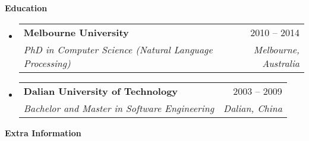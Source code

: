 \documentclass[letterpaper,12pt]{article}[leftmargin=*]
\makeatletter
\def \entryspacing {-0pt}
\renewcommand{\section}[2]{\vspace{5pt}
  \colorbox{secondary}{\color{white}\raggedbottom\normalsize\textbf{{#1}{\hspace{7pt}#2}}}
}
\newcommand{\resumeEntryStart}{\begin{itemize}[leftmargin=2.5mm]}
\newcommand{\resumeEntryEnd}{\end{itemize}\vspace{\entryspacing}}
\newcommand{\resumeItemListStart}{\begin{itemize}[leftmargin=4.5mm]}
\newcommand{\resumeItemListEnd}{\end{itemize}}
\newcommand{\resumeItem}[1]{
  \item\small{
    {#1 \vspace{-2pt}}
  }
}
\newcommand{\resumeEntryTSDL}[4]{
  \vspace{-1pt}\item[]
    \begin{tabularx}{0.97\textwidth}{X@{\hspace{60pt}}r}
      \textbf{\color{primary}#1} & {\firabook\color{accent}\small#2} \\
      \textit{\color{accent}\small#3} & \textit{\color{accent}\small#4} \\
    \end{tabularx}\vspace{-6pt}
}
\newcommand{\resumeEntryS}[2]{
  \item[]\small{
    \textbf{\color{primary}#1 }{ #2 \vspace{-6pt}}
  }
}
\makeatother
\begin{document}
%

\section{\faGraduationCap}{Education}

  \resumeEntryStart
    \resumeEntryTSDL
      {Melbourne University}{2010 -- 2014}
      {PhD in Computer Science (Natural Language Processing)}{Melbourne, Australia}
    \resumeEntryTSDL
      {Dalian University of Technology}{2003 -- 2009}
      {Bachelor and Master in Software Engineering}{Dalian, China}
  \resumeEntryEnd

\section{\faGears}{Extra Information}
\end{document}
